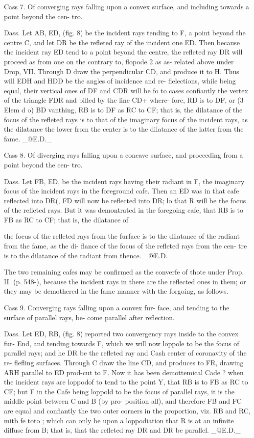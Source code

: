 \documentclass{article}
\begin{document}
Cass 7. Of converging rays falling upon a convex surface, and including towards a point beyond the cen- tro.

Dass. Let AB, ED, (fig. 8) be the incident rays tending to F, a point beyond the centre C, and let DR be the refleted ray of the incident one ED. Then because the incident ray ED tend to a point beyond the centre, the refleted ray DR will proceed as from one on the contrary to, flopode 2 as as- related above under Drop, VII. Through D draw the perpendicular CD, and produce it to H. Thus will EDH and HDD be the angles of incidence and re- flelections, while being equal, their vertical ones of DF and CDR will be fo to cases confiantly the vertex of the triangle FDR and bifled by the line CD+ where- fore, RD is to DF, or (3 Elem d o) BD vanthing, RB is to DF as RC to CF; that is, the dilatance of the focus of the refleted rays is to that of the imaginary focus of the incident rays, as the dilatance the lower from the center is to the dilatance of the latter from the fame. \_@E.D.\_

Cass 8. Of diverging rays falling upon a concave surface, and proceeding from a point beyond the cen- tro.

Dass. Let FB, ED, be the incident rays having their radiant in F, the imaginary focus of the incident rays in the foreground cafe. Then an ED was in that cafe reflected into DR(, FD will now be reflected into DR; lo that R will be the focus of the refleted rays. But it was demontrated in the foregoing cafe, that RB is to FB as RC to CF; that is, the dilatance of

the focus of the refleted rays from the furface is to the dilatance of the radiant from the fame, as the di- flance of the focus of the refleted rays from the cen- tre is to the dilatance of the radiant from thence. \_@E.D.\_

The two remaining cafes may be confirmed as the converfe of thote under Prop. II. (p. 548-), because the incident rays in there are the reflected ones in them; or they may be demothered in the fame manner with the forgoing, as follows.

Cass 9. Converging rays falling upon a convex fur- face, and tending to the surface of parallel rays, be- come parallel after reflection.

Dass. Let ED, RB, (fig. 8) reported two convergency rays inside to the convex fur- End, and tending towards F, which we will now loppole to be the focus of parallel rays; and he DR be the refleted ray and Cash center of coronavity of the re- flefling surfaces. Through C draw the line CD, and produces to FR, drawing ARH parallel to ED prod-cut to F. Now it has been demottemical Cade ? when the incident rays are loppodof to tend to the point Y, that RB is to FB as RC to CF; but F in the Cafe being loppold to be the focus of parallel rays, it is the middle point between C and B (by pro- position all), and therefore FB and FC are equal and confiantly the two outer corners in the proportion, viz. RB and RC, mitb fe toto ; which can only be upon a loppodiation that R is at an infinite diffuse from B; that is, that the refleted ray DR and DR be parallel. \_@E.D.\_
\end{document}
